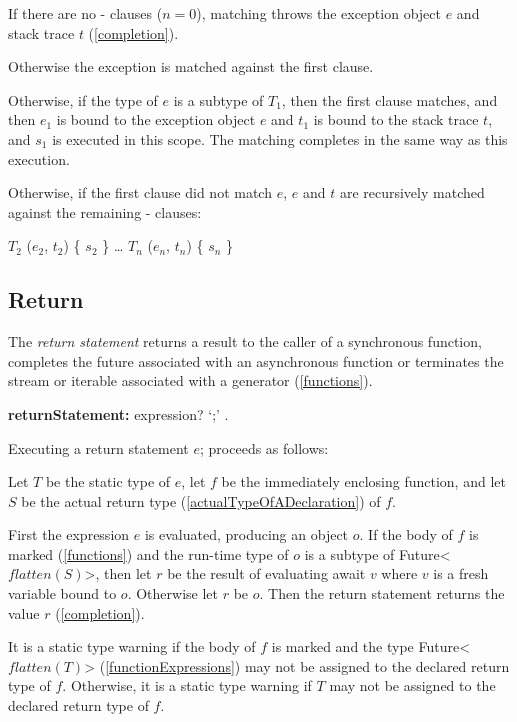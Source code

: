 \documentclass{article}
\newcommand{\code}[1]{{\sf #1}}
\begin{document}
\LMHash{}
If there are no \ON{}-\CATCH{} clauses ($n = 0$), matching throws the exception object $e$ and stack trace $t$ (\ref{completion}).

\LMHash{}
Otherwise the exception is matched against the first clause.

\LMHash{}
Otherwise, if the type of $e$ is a subtype of $T_1$, then the first clause matches, and then $e_1$ is bound to the exception object $e$ and $t_1$ is bound to the stack trace $t$, and $s_1$ is executed in this scope.
The matching completes in the same way as this execution.

\LMHash{}
Otherwise, if the first clause did not match $e$, $e$ and $t$ are recursively matched against the remaining \ON{}-\CATCH{} clauses:
\begin{dartCode}
\ON{} $T_2$ \CATCH{} ($e_2$, $t_2$) \{ $s_2$ \}
\ldots
\ON{} $T_n$ \CATCH{} ($e_n$, $t_n$) \{ $s_n$ \}
\end{dartCode}


\subsection{ Return}

\LMHash{}
The {\em return statement} returns a result to the caller of a synchronous function, completes the future associated with an asynchronous function or terminates the stream or iterable associated with a generator (\ref{functions}).


 \begin{grammar}
{\bf returnStatement:}
    \RETURN{} expression? `{\escapegrammar ;}' %
    .
 \end{grammar}

\LMHash{}
Executing a return statement \code{\RETURN{} $e$;} proceeds as follows:

\LMHash{}
Let $T$ be the static type of $e$, let $f$ be the immediately enclosing function, and let $S$ be the actual return type (\ref{actualTypeOfADeclaration}) of $f$.

\LMHash{}
First the expression $e$ is evaluated, producing an object $o$.
If the body of $f$ is marked \ASYNC{} (\ref{functions}) and the run-time type of $o$ is a subtype of \code{Future<$flatten(S)$>}, then let $r$ be the result of evaluating \code{await $v$} where $v$ is a fresh variable bound to $o$. Otherwise let $r$ be $o$.
Then the return statement returns the value $r$ (\ref{completion}).

\LMHash{}
It is a static type warning if the body of $f$ is marked \ASYNC{} and the type \code{Future<$flatten(T)$>} (\ref{functionExpressions}) may not be assigned to the declared return type of $f$. Otherwise, it is a static type warning if $T$ may not be assigned to the declared return type of $f$.
\end{document}

